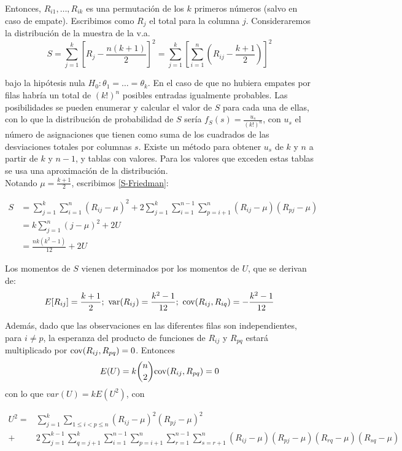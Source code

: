 	Entonces, $R_{i1}, \dots, R_{ik}$ es una permutación de los $k$ primeros números (salvo en caso de empate). Escribimos como $R_j$ el total para la columna $j$. Consideraremos la distribución de la muestra de la v.a. 
	\begin{equation}
		 S = \sum\limits_{j=1}^k
				\left[
					R_j - \frac{n(k+1)}{2}
				\right]^2 =
			\sum\limits_{j=1}^k \left[
				\sum\limits_{i=1}^n \left(
					R_{ij} - \frac{k+1}{2}
				\right)
			\right]^2
	\label{S-Friedman}
	\end{equation}
	
	bajo la hipótesis nula $H_0: \theta_1 = \dots = \theta_k$. En el caso de que no hubiera empates por filas habría un total de $(k!)^n$ posibles entradas igualmente probables. Las posibilidades se pueden enumerar y calcular el valor de $S$ para cada una de ellas, con lo que la distribución de probabilidad de $S$ sería $f_S(s) = \frac{u_s}{(k!)^n}$, con $u_s$ el número de asignaciones que tienen como suma de los cuadrados de las desviaciones totales por columnas $s$. Existe un método para obtener $u_s$ de $k$ y $n$ a partir de $k$ y $n-1$, y tablas con valores. Para los valores que exceden estas tablas se usa una aproximación de la distribución.\\
	Notando $\mu = \frac{k+1}{2}$, escribimos \ref{S-Friedman}:
	
	\begin{align}
		S 	&= 	\sum\limits_{j=1}^k
					\sum\limits_{i=1}^n (R_{ij}-\mu)^2
				+ 2 \sum\limits_{j=1}^k
					\sum\limits_{i=1}^{n-1}
						\sum\limits_{p=i+1}^n
							(R_{ij}-\mu)(R_{pj}-\mu) 
				\nonumber \\
			&=	k \sum\limits_{j=1}^n (j-\mu)^2 + 2U 
				\nonumber \\
			&=  \frac{nk(k^2-1)}{12} + 2U	
	\label{S-Friedman2}
	\end{align}
	
	Los momentos de $S$ vienen determinados por los momentos de $U$, que se derivan de:
	\[ 	E[ R_{ij} ]= \frac{k+1}{2};\ 
		\var(R_{ij})=\frac{k^2-1}{12};\
		\cov(R_{ij},R_{iq}) = -\frac{k^2-1}{12}
	\]
	
	Además, dado que las observaciones en las diferentes filas son independientes, para $i \neq p$, la esperanza del producto de funciones de $R_{ij}$ y $R_{pq}$ estará multiplicado por $\text{cov}(R_{ij},R_{pq})=0$. Entonces
	\[ E(U) = k {n \choose 2} \text{cov}(R_{ij},R_{pq})=0 \] con lo que $var(U) = kE(U^2)$, con
	
	\begin{align*}
		U^2 =& \sum\limits_{j=1}^k
				\sum\limits_{1 \leq i < p \leq n}
					(R_{ij} - \mu)^2 (R_{pj} - \mu)^2 \\
			+& 2 
			    \sum\limits_{j=1}^{k-1}
			      \sum\limits_{q=j+1}^k
					\sum\limits_{i=1}^{n-1}
					  \sum\limits_{p=i+1}^n	
					  	\sum\limits_{r=1}^{n-1}
						  \sum\limits_{s=r+1}^n
				(R_{ij} - \mu)(R_{pj} - \mu)
				(R_{rq} - \mu)(R_{sq} - \mu)	
	\end{align*}
	

